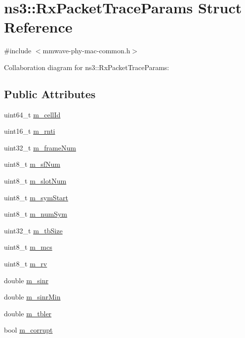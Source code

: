 \hypertarget{structns3_1_1RxPacketTraceParams}{}\section{ns3\+:\+:Rx\+Packet\+Trace\+Params Struct Reference}
\label{structns3_1_1RxPacketTraceParams}


{\ttfamily \#include $<$mmwave-\/phy-\/mac-\/common.\+h$>$}



Collaboration diagram for ns3\+:\+:Rx\+Packet\+Trace\+Params\+:
\subsection*{Public Attributes}
\begin{DoxyCompactItemize}
\item 
uint64\+\_\+t \hyperlink{structns3_1_1RxPacketTraceParams_a8d63e45ee888557ed0a0c5df1e7efb2d}{m\+\_\+cell\+Id}
\item 
uint16\+\_\+t \hyperlink{structns3_1_1RxPacketTraceParams_a5ef28c644f2cc351c7a896548232fcd4}{m\+\_\+rnti}
\item 
uint32\+\_\+t \hyperlink{structns3_1_1RxPacketTraceParams_a06fbec1a397913ba400d2042d301034c}{m\+\_\+frame\+Num}
\item 
uint8\+\_\+t \hyperlink{structns3_1_1RxPacketTraceParams_a7bf3088bfb599374ee1dc7d909cbd6ee}{m\+\_\+sf\+Num}
\item 
uint8\+\_\+t \hyperlink{structns3_1_1RxPacketTraceParams_a90d0c1f38ad5963c13db9045c4cd51db}{m\+\_\+slot\+Num}
\item 
uint8\+\_\+t \hyperlink{structns3_1_1RxPacketTraceParams_a04b3f2032b9627f276e2a0af3dea0551}{m\+\_\+sym\+Start}
\item 
uint8\+\_\+t \hyperlink{structns3_1_1RxPacketTraceParams_a77ef0bb7722fc48decd2f2c58eb3c3a2}{m\+\_\+num\+Sym}
\item 
uint32\+\_\+t \hyperlink{structns3_1_1RxPacketTraceParams_ac5cd4fcbdfa8883531b0e316d097bbe0}{m\+\_\+tb\+Size}
\item 
uint8\+\_\+t \hyperlink{structns3_1_1RxPacketTraceParams_a97bdfa48fd7a7d2f89ab4f67e2898deb}{m\+\_\+mcs}
\item 
uint8\+\_\+t \hyperlink{structns3_1_1RxPacketTraceParams_a173fabf51b4917a070e28a60f6d7e33b}{m\+\_\+rv}
\item 
double \hyperlink{structns3_1_1RxPacketTraceParams_a345d6584b3efb41a488bca45fd36b3b9}{m\+\_\+sinr}
\item 
double \hyperlink{structns3_1_1RxPacketTraceParams_a71669e8c69e1ca046f9aaa2cf1ea38ad}{m\+\_\+sinr\+Min}
\item 
double \hyperlink{structns3_1_1RxPacketTraceParams_a0e8ecd8a819a9b89219daa727dae77f0}{m\+\_\+tbler}
\item 
bool \hyperlink{structns3_1_1RxPacketTraceParams_ac42e8da01ebf83086c40a6b7c6b21012}{m\+\_\+corrupt}
\end{DoxyCompactItemize}


